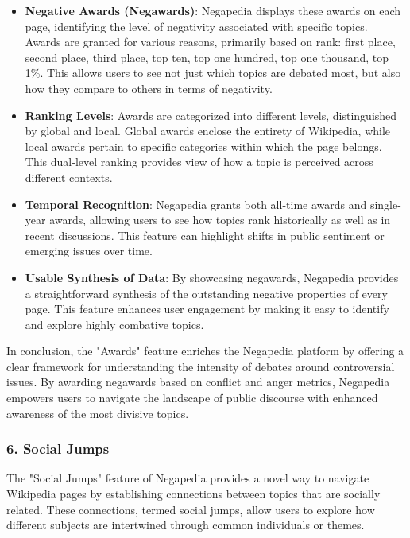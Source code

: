 \begin{itemize}
    \item \textbf{Negative Awards (Negawards)}: Negapedia displays these awards on each page, identifying the level of negativity associated with specific topics. Awards are granted for various reasons, primarily based on rank: first place, second place, third place, top ten, top one hundred, top one thousand, top 1\%. This allows users to see not just which topics are debated most, but also how they compare to others in terms of negativity.
    
    \item \textbf{Ranking Levels}: Awards are categorized into different levels, distinguished by global and local. Global awards enclose the entirety of Wikipedia, while local awards pertain to specific categories within which the page belongs. This dual-level ranking provides view of how a topic is perceived across different contexts.
    
    \item \textbf{Temporal Recognition}: Negapedia grants both all-time awards and single-year awards, allowing users to see how topics rank historically as well as in recent discussions. This feature can highlight shifts in public sentiment or emerging issues over time.
    
    \item \textbf{Usable Synthesis of Data}: By showcasing negawards, Negapedia provides a straightforward synthesis of the outstanding negative properties of every page. This feature enhances user engagement by making it easy to identify and explore highly combative topics.
\end{itemize}

In conclusion, the "Awards" feature enriches the Negapedia platform by offering a clear framework for understanding the intensity of debates around controversial issues. By awarding negawards based on conflict and anger metrics, Negapedia empowers users to navigate the landscape of public discourse with enhanced awareness of the most divisive topics.

\subsubsection{6. Social Jumps}

The "Social Jumps" feature of Negapedia provides a novel way to navigate Wikipedia pages by establishing connections between topics that are socially related. These connections, termed social jumps, allow users to explore how different subjects are intertwined through common individuals or themes.

